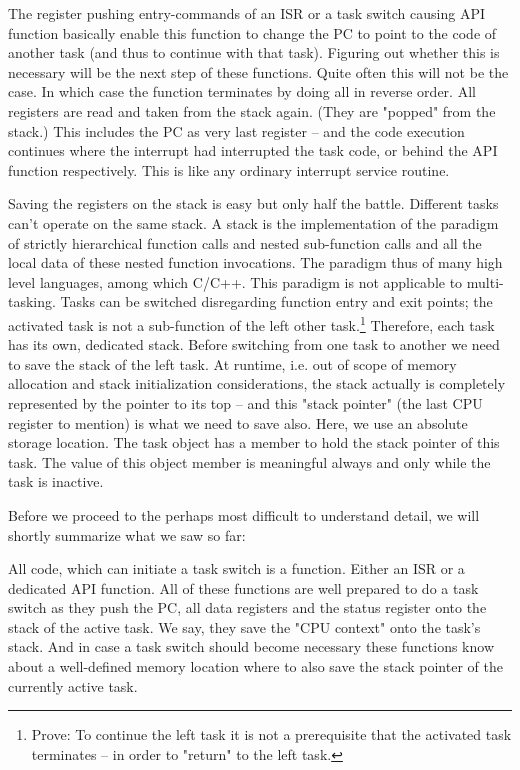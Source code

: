The register pushing entry-commands of an ISR or a task switch causing API
function basically enable this function to change the PC to point to the
code of another task (and thus to continue with that task). Figuring out
whether this is necessary will be the next step of these functions. Quite
often this will not be the case. In which case the function terminates by
doing all in reverse order. All registers are read and taken from the
stack again. (They are "popped" from the stack.) This includes the PC as
very last register -- and the code execution continues where the interrupt
had interrupted the task code, or behind the API function respectively.
This is like any ordinary interrupt service routine.

Saving the registers on the stack is easy but only half the battle.
Different tasks can't operate on the same stack. A stack is the
implementation of the paradigm of strictly hierarchical function calls and
nested sub-function calls and all the local data of these nested function
invocations. The paradigm thus of many high level languages, among which
C/C++. This paradigm is not applicable to multi-tasking. Tasks can be
switched disregarding function entry and exit points; the activated task
is not a sub-function of the left other task.\footnote{Prove: To continue
the left task it is not a prerequisite that the activated task terminates
-- in order to "return" to the left task.} Therefore, each task has its
own, dedicated stack. Before switching from one task to another we need to
save the stack of the left task. At runtime, i.e. out of scope of memory
allocation and stack initialization considerations, the stack actually is
completely represented by the pointer to its top -- and this "stack
pointer" (the last CPU register to mention) is what we need to save also.
Here, we use an absolute storage location. The task object has a member to
hold the stack pointer of this task. The value of this object member is
meaningful always and only while the task is inactive.

Before we proceed to the perhaps most difficult to understand detail, we
will shortly summarize what we saw so far:

All code, which can initiate a task switch is a function. Either an ISR or
a dedicated API function. All of these functions are well prepared to do a
task switch as they push the PC, all data registers and the status
register onto the stack of the active task. We say, they save the "CPU
context" onto the task's stack. And in case a task switch should become
necessary these functions know about a well-defined memory location where
to also save the stack pointer of the currently active task.

